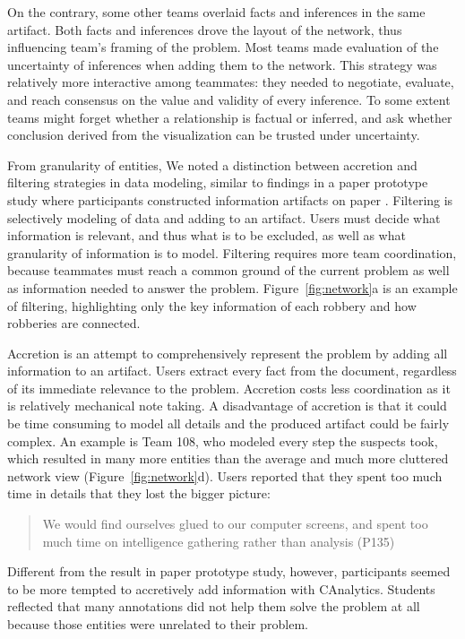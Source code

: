 On the contrary, some other teams overlaid facts and inferences in the
same artifact. Both facts and inferences drove the layout of the
network, thus influencing team's framing of the problem. Most teams made
evaluation of the uncertainty of inferences when adding them to the
network. This strategy was relatively more interactive among teammates:
they needed to negotiate, evaluate, and reach consensus on the value and
validity of every inference. To some extent teams might forget whether a
relationship is factual or inferred, and ask whether conclusion derived
from the visualization can be trusted under uncertainty.

From granularity of entities, We noted a distinction between accretion
and filtering strategies in data modeling, similar to findings in a paper prototype study where participants constructed information artifacts on paper \autocite{Carroll2013}. Filtering is selectively modeling of data
and adding to an artifact. Users must decide what information is
relevant, and thus what is to be excluded, as well as what granularity
of information is to model. Filtering requires more team coordination,
because teammates must reach a common ground of the current problem as
well as information needed to answer the problem. Figure~\ref{fig:network}a is an example of filtering, highlighting only
the key information of each robbery and how robberies are connected.

Accretion is an attempt to comprehensively represent the problem by
adding all information to an artifact. Users extract every fact from the
document, regardless of its immediate relevance to the problem.
Accretion costs less coordination as it is relatively mechanical note
taking. A disadvantage of accretion is that it could be time consuming
to model all details and the produced artifact could be fairly complex.
An example is Team 108, who modeled every step the suspects took, which
resulted in many more entities than the average and much more cluttered
network view (Figure~\ref{fig:network}d). Users reported that they
spent too much time in details that they lost the bigger picture:

\begin{quote}
We would find ourselves glued to our computer screens, and spent too
much time on intelligence gathering rather than analysis (P135)
\end{quote}

Different from the result in paper prototype study, however,
participants seemed to be more tempted to accretively add information
with CAnalytics. Students reflected that many annotations did not help
them solve the problem at all because those entities were unrelated to
their problem.


